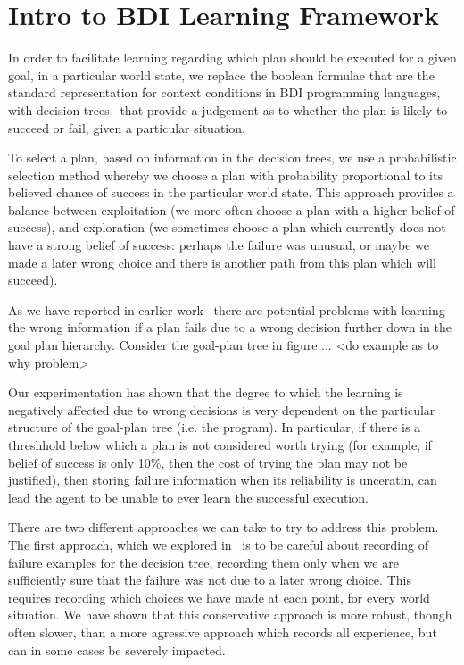 \section{Intro to BDI Learning Framework}\label{sec:introlearning}
In order to facilitate learning regarding which plan should be
executed for a given goal, in a particular world state, we replace the
boolean formulae that are the standard representation for context
conditions in BDI programming languages, with decision
trees~\cite{Mitchell97:ML} that provide a judgement as to whether the
plan is likely to succeed or fail, given a particular situation. 

To select a plan, based on information in the decision trees, we use a
probabilistic selection method whereby we choose a plan with
probability proportional to its believed chance of success in the
particular world state. This approach provides a balance between
exploitation (we more often choose a plan with a higher belief of
success), and exploration (we sometimes choose a plan which currently
does not have a strong belief of success: perhaps the failure was
unusual, or maybe we made a later wrong choice and there is another
path from this plan which will succeed).

As we have reported in earlier work~\cite{Airiau:IJAT:09} there are
potential problems with learning the wrong information if a plan fails
due to a wrong decision further down in the goal plan
hierarchy. Consider the goal-plan tree in figure ... <do example as to why
problem>

Our experimentation has shown that the degree to which the learning is
negatively affected due to wrong decisions is very dependent on
the particular structure of the goal-plan tree (i.e. the
program). In particular, if there is a threshhold below which a plan
is not considered worth trying (for example, if belief of success is
only 10\%, then the cost of trying the plan may not be justified),
then storing failure information when its reliability is unceratin,
can lead the agent to be unable to ever learn the successful
execution. 

There are two different approaches we can take to try to address this
problem. The first approach, which we explored
in~\cite{Airiau:IJAT:09} is to be careful about recording of failure
examples for the decision tree, recording them only when we are
sufficiently sure that the failure was not due to a later wrong
choice. This requires recording which choices we have made at each
point, for every world situation. We have shown that this conservative
approach is more robust, though often slower, than a more agressive
approach which records all experience, but can in some cases be
severely impacted.

